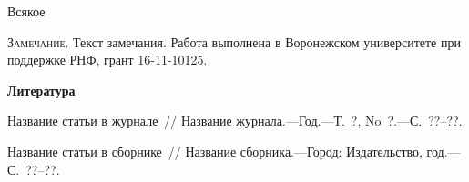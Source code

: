 







%
\begin{theorem}
	Всякое
\end{theorem}


%
%
%
%
%



\textsc{Замечание.} Текст замечания.
%
%
%
%
{\small Работа выполнена в Воронежском университете при поддержке РНФ, грант 16-11-10125.}
%
%
%
%

\par\bigskip\centerline{\bf Литература}\smallskip

 \begin{enumerate}

 \itemsep=0pt\parskip=0pt



 {Название статьи в
журнале~/\!/ Название журнала.---Год.---Т.~?, No~?.---С.~??--??.}

{Название статьи в сборнике~/\!/ Название сборника.---Город:
Издательство, год.---С.~??--??.}

 \end{enumerate}





